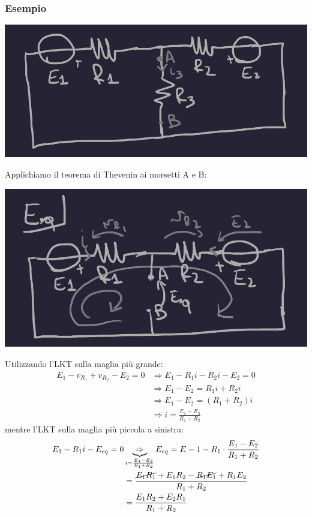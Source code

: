 \documentclass{article}
\begin{document}
\subsubsection{Esempio}
\begin{center}
    \includegraphics[scale=0.27]{Image/Esempio_Thevenin_1.png}
\end{center}
Applichiamo il teorema di Thevenin ai morsetti A e B:
\begin{center}
    \includegraphics[scale=0.25]{Image/Esempio_Thevenin_2.png}
\end{center}
Utilizzando l'LKT sulla maglia più grande:
\begin{align*}
    E_1 - v_{R_1} + v_{R_2} - E_2=0 &\Rightarrow E_1 - R_1i - R_2i - E_2=0\\
    &\Rightarrow E_1 - E_2 = R_1i + R_2 i \\
    & \Rightarrow E_1 - E_2 = (R_1 + R_2)i\\
    & \Rightarrow i = \frac{E_1-E_2}{R_1+R_2}
\end{align*}
mentre l'LKT sulla maglia più piccola a sinistra:
\begin{align*}
    E_1 - R_1i -E_{eq}=0 &\underbrace{\Rightarrow}_{i=\frac{E_1-E_2}{R_1+R_2}} E_{eq} = E-1-R_1 \cdot \frac{E_1-E_2}{R_1+R_2} \\
    &= \frac{\cancel{E_1R_1}+E_1R_2-\cancel{R_1E_1}+R_1E_2}{R_1+R_2}\\
    & = \frac{E_1R_2+E_2R_1}{R_1+R_2}
\end{align*}
\end{document}
